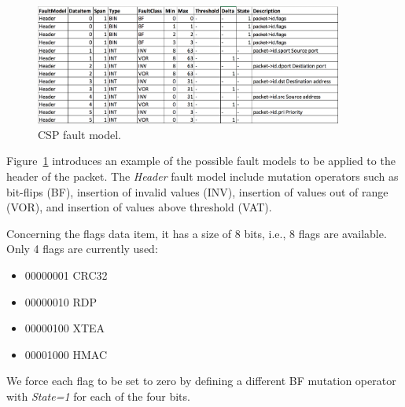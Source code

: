 \begin{figure}[h]
  \centering
    \includegraphics[width=0.9\textwidth]{images/FaultModelCSP_temp}
      \caption{CSP fault model.}
      \label{fig:csp_faultmodel}
\end{figure}

Figure~\ref{fig:csp_faultmodel} introduces an example of the possible fault models to be applied to the  header of the packet.
The \emph{Header} fault model include mutation operators such as bit-flips (BF), insertion of invalid values (INV), insertion of values out of range (VOR), and insertion of values above threshold (VAT).

Concerning the flags data item, it has a size of 8 bits, i.e., 8 flags are available. Only 4 flags are currently used:
\begin{itemize}
\item 00000001              CRC32
\item 00000010             RDP
\item 00000100             XTEA
\item 00001000             HMAC
\end{itemize}
We force each flag to be set to zero by defining a different BF mutation operator with \emph{State=1} for each of the four bits.





